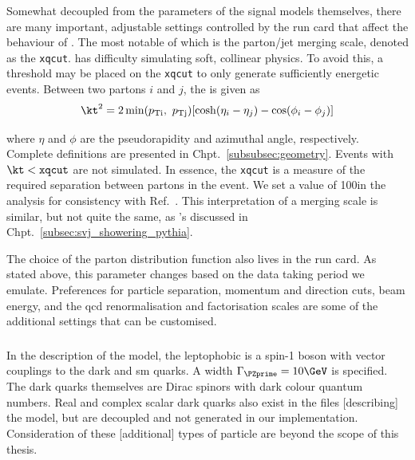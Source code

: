 Somewhat decoupled from the parameters of the signal models themselves, there are many important, adjustable settings controlled by the run card that affect the behaviour of \MADGRAPH. The most notable of which is the parton/\gls{jet} merging scale, denoted as the \texttt{xqcut}. \MADGRAPH has difficulty simulating soft, collinear physics. To avoid this, a threshold may be placed on the \texttt{xqcut} to only generate sufficiently energetic events. Between two partons $i$ and $j$, the \kt is given as
\begin{equation}
    \kt^2 = 2 \min(p_{\mathrm{Ti}}, \ p_{\mathrm{Tj}}) [\cosh(\eta_i - \eta_j) - \cos(\phi_i - \phi_j)]
    \label{eq:svj_mg_kt}
\end{equation}

where $\eta$ and $\phi$ are the pseudorapidity and azimuthal angle, respectively. Complete definitions are presented in Chpt.~\ref{subsubsec:geometry}. Events with $\kt < \texttt{xqcut}$ are not simulated. In essence, the \texttt{xqcut} is a measure of the required separation between partons in the event. We set a value of 100\GeV in the analysis for consistency with Ref.~. This interpretation of a merging scale is similar, but not quite the same, as \PYTHIA's discussed in Chpt.~\ref{subsec:svj_showering_pythia}.

The choice of the parton distribution function also lives in the run card. As stated above, this parameter changes based on the data taking period we emulate. Preferences for particle separation, momentum and direction cuts, beam energy, and the \acrshort{qcd} renormalisation and factorisation scales are some of the additional settings that can be customised.




\subsubsection{\texorpdfstring{\schannel}{s-channel}}
\label{subsubsec:svj_signal_madgraph_schannel}

In the description of the \schannel model, the leptophobic \PZprime is a spin-1 boson with vector couplings to the dark and \acrshort{sm} quarks. A width $\Gamma_{\PZprime} = \text{10}\GeV$ is specified. The dark quarks themselves are Dirac spinors with dark colour quantum numbers. Real and complex scalar dark quarks also exist in the files [describing] the model, but are decoupled and not generated in our implementation. Consideration of these [additional] types of particle are beyond the scope of this thesis.

